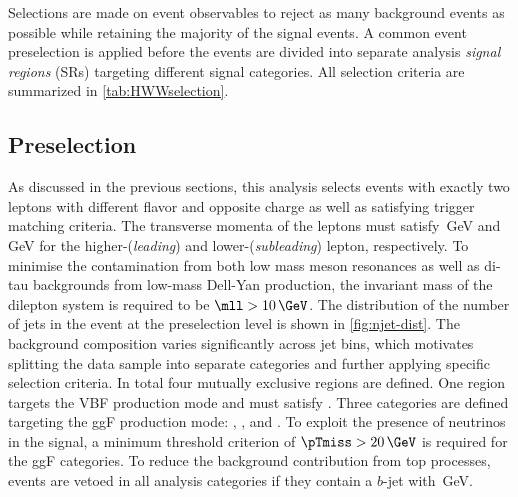 




Selections are made on event observables to reject as many background events as possible while retaining the majority of the signal events.
A common event preselection is applied before the events are divided into separate analysis \emph{signal regions} (SRs) targeting different signal categories.
All selection criteria are summarized in \cref{tab:HWWselection}. 

\begin{table}[!ht]
    \centering
    \caption{
    Event selection criteria used to define the SRs in the \hwwenmn\ analysis. The definitions of the variables can be found in the text.
    \label{tab:HWWselection}
    }
    \scalebox{0.76}{
    
    }
\end{table}

\subsection{Preselection}
\label{subsec:preselection}
As discussed in the previous sections, this analysis selects events with exactly two leptons with different flavor and opposite charge as well as satisfying trigger matching criteria.
The transverse momenta of the leptons must satisfy \,GeV and \,GeV for the higher-\pT (\emph{leading}) and lower-\pT (\emph{subleading}) lepton, respectively.
To minimise the contamination from both low mass meson resonances as well as di-tau backgrounds from low-mass Dell-Yan production, the invariant mass of the dilepton system is required to be $\mll > 10\,\GeV$.
The distribution of the number of jets in the event at the preselection level is shown in \cref{fig:njet-dist}.
The background composition varies significantly across jet bins, which motivates splitting the data sample into separate \Njet categories and further applying specific selection criteria.
In total four mutually exclusive regions are defined.
One region targets the VBF production mode and must satisfy \TwoJet.
Three categories are defined targeting the ggF production mode: \ZeroJet, \OneJet, and \TwoJet.
To exploit the presence of neutrinos in the signal, a minimum threshold criterion of $\pTmiss > 20\,\GeV$ is required for the ggF categories.
To reduce the background contribution from top processes, events are vetoed in all analysis categories if they contain a $b$-jet with \,GeV.

